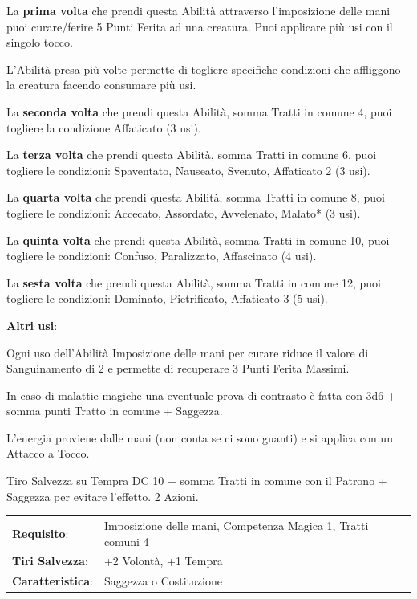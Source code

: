 \begin{multicols}{2}
\medskip

La \textbf{prima volta} che prendi questa Abilità attraverso l'imposizione delle mani puoi curare/ferire 5 Punti Ferita ad una creatura. Puoi applicare più usi con il singolo tocco.

L'Abilità presa più volte permette di togliere specifiche condizioni che affliggono la creatura facendo consumare più usi.

La \textbf{seconda volta} che prendi questa Abilità, somma Tratti in comune 4, puoi togliere la condizione Affaticato (3 usi).

La \textbf{terza volta} che prendi questa Abilità, somma Tratti in comune 6, puoi togliere le condizioni: Spaventato, Nauseato, Svenuto, Affaticato 2 (3 usi).

La \textbf{quarta volta} che prendi questa Abilità, somma Tratti in comune 8, puoi togliere le condizioni: Accecato, Assordato, Avvelenato, Malato* (3 usi).

La \textbf{quinta volta} che prendi questa Abilità, somma Tratti in comune 10, puoi togliere le condizioni: Confuso, Paralizzato, Affascinato (4 usi).

La \textbf{sesta volta} che prendi questa Abilità, somma Tratti in comune 12, puoi togliere le condizioni: Dominato, Pietrificato, Affaticato 3 (5 usi).

\textbf{Altri usi}:

\smallskip

Ogni uso dell'Abilità Imposizione delle mani per curare riduce il valore di Sanguinamento di 2 e permette di recuperare 3 Punti Ferita Massimi.

In caso di malattie magiche una eventuale prova di contrasto è fatta con 3d6 + somma punti Tratto in comune + Saggezza.

L'energia proviene dalle mani (non conta se ci sono guanti) e si applica con un Attacco a Tocco.

Tiro Salvezza su Tempra DC 10 + somma Tratti in comune con il Patrono + Saggezza per evitare l'effetto. 2 Azioni.



\noindent\begin{tabularx}{\linewidth}{>{\raggedright\arraybackslash}p{2.5cm}X}
\rowcolor{gray!20}\textbf{Requisito}: & Imposizione delle mani, Competenza Magica 1, Tratti comuni 4\\
\textbf{Tiri Salvezza}: & +2 Volontà, +1 Tempra\\
\rowcolor{gray!20}\textbf{Caratteristica}: & Saggezza o Costituzione\\
\end{tabularx}\smallskip


\end{multicols}
